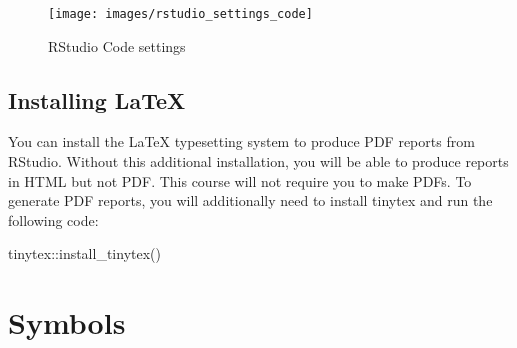 \documentclass[
  oneside]{book}
\newenvironment{Shaded}{\begin{snugshade}}{\end{snugshade}}
\newcommand{\FunctionTok}[1]{\textcolor[rgb]{0.00,0.00,0.00}{#1}}
\newcommand{\NormalTok}[1]{#1}
\newcommand{\SpecialCharTok}[1]{\textcolor[rgb]{0.00,0.00,0.00}{#1}}
\begin{document}
\begin{figure}

{\centering \texttt{[image: images/rstudio\_settings\_code]} 

}

\caption{RStudio Code settings}\label{fig:settings-code}
\end{figure}

\hypertarget{installing-latex}{%
\section{Installing LaTeX}\label{installing-latex}}

You can install the LaTeX typesetting system to produce PDF reports from RStudio. Without this additional installation, you will be able to produce reports in HTML but not PDF. This course will not require you to make PDFs. To generate PDF reports, you will additionally need to install tinytex \citep{R-tinytex} and run the following code:

\begin{Shaded}
\begin{Highlighting}[]
\NormalTok{tinytex}\SpecialCharTok{::}\FunctionTok{install\_tinytex}\NormalTok{()}
\end{Highlighting}
\end{Shaded}

\hypertarget{symbols}{%
\chapter{Symbols}\label{symbols}}
\end{document}
